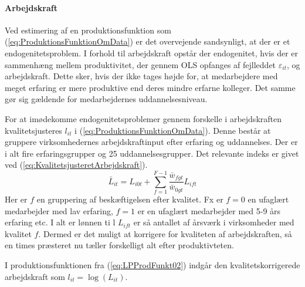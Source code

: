 \paragraph{Arbejdskraft}
Ved estimering af en produktionsfunktion som (\ref{eq:ProduktionsFunktionOmData}) er det overvejende sandsynligt, at der er et endogenitetsproblem. I forhold til arbejdskraft opstår der endogenitet, hvis der er sammenhæng mellem produktivitet, der gennem OLS opfanges af fejlleddet $\varepsilon_{it}$, og arbejdskraft. Dette sker, hvis der ikke tages højde for, at medarbejdere med meget erfaring er mere produktive end deres mindre erfarne kolleger. Det samme gør sig gældende for medarbejdernes uddannelsesniveau.
%

For at imødekomme endogenitetsproblemer gennem forskelle i arbejdskraften kvalitetsjusteres $l_{it}$ i (\ref{eq:ProduktionsFunktionOmData}). Denne består at gruppere virksomhedernes arbejdskraftinput efter erfaring og uddannelses. Der er i alt fire erfaringsgrupper og 25 uddannelsesgrupper. Det relevante indeks er givet ved (\ref{eq:KvalitetsjusteretArbejdskraft}).
\begin{equation}
	\bar{L}_{it} = 
	L_{i0t} + \sum_{f=1}^{F-1} \frac{\bar{w}_{fgt}}{\bar{w}_{0gt}} 
	L_{ift}
	\label{eq:KvalitetsjusteretArbejdskraft}
\end{equation}
Her er $f$ en gruppering af beskæftigelsen efter kvalitet. Fx er $f=0$ en ufaglært medarbejder med lav erfaring, $f=1$ er en ufaglært medarbejder med 5-9 års erfaring etc. I alt er lønnen ti l
$L_{ift}$ er så antallet af årsværk i virksomheder med kvalitet $f$. Dermed er det muligt at korrigere for kvaliteten af arbejdskraften, så en times præsteret nu tæller forskelligt alt efter produktivteten.

I produktionsfunktionen fra (\ref{eq:LPProdFunkt02}) indgår den kvalitetskorrigerede arbejdskraft som $l_{it} = \log(L_{it})$.  


